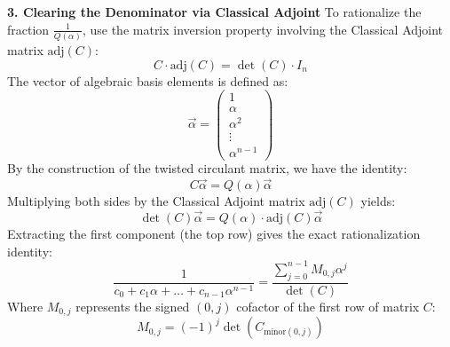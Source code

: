 {\bf 3. Clearing the Denominator via Classical Adjoint}
To rationalize the fraction \(\frac{1}{Q(\alpha )}\), use the matrix inversion property involving the Classical Adjoint matrix 
\(\text{adj}(C)\): \[C\cdot \text{adj}(C)=\det (C)\cdot I_{n}\]
The vector of algebraic basis elements is defined as:
\[\vec{\alpha }=\left(\begin{matrix}1\\ \alpha \\ \alpha ^{2}\\ \vdots \\ \alpha ^{n-1}\end{matrix}\right)\]
By the construction of the twisted circulant matrix, we have the identity:
\[C\vec{\alpha }=Q(\alpha )\vec{\alpha }\]
Multiplying both sides by the Classical Adjoint matrix 
\(\text{adj}(C)\) yields:\[\det (C)\vec{\alpha }=Q(\alpha )\cdot \text{adj}(C)\vec{\alpha }\]
Extracting the first component (the top row) gives the exact rationalization identity:
\[\frac{1}{c_{0}+c_{1}\alpha +\dots + c_{n-1}\alpha ^{n-1}}=\frac{\sum _{j=0}^{n-1}M_{0,j}\alpha ^{j}}{\det (C)}\]
Where \(M_{0,j}\) represents the signed \((0,j)\) cofactor of the first row of matrix \(C\):
\[M_{0,j}=(-1)^{j}\det (C_{\text{minor}(0,j)})\]




